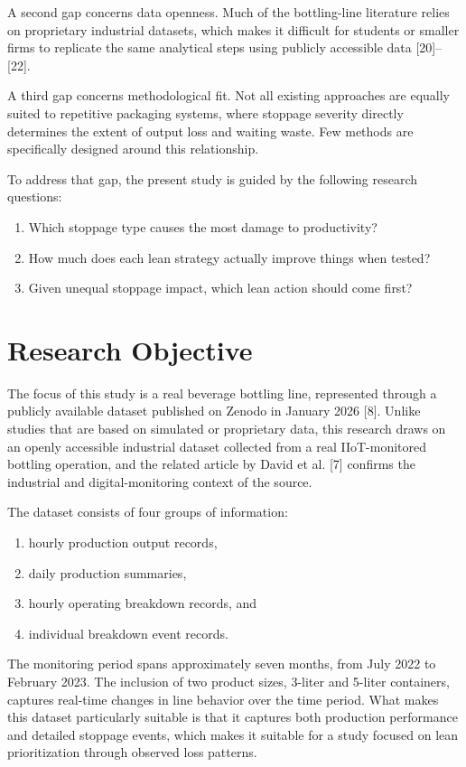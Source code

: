 \documentclass[12pt,a4paper]{article}
\begin{document}
A second gap concerns data openness. Much of the bottling-line literature relies on proprietary industrial datasets, which makes it difficult for students or smaller firms to replicate the same analytical steps using publicly accessible data [20]--[22].

A third gap concerns methodological fit. Not all existing approaches are equally suited to repetitive packaging systems, where stoppage severity directly determines the extent of output loss and waiting waste. Few methods are specifically designed around this relationship.

To address that gap, the present study is guided by the following research questions:
\begin{enumerate}
    \item Which stoppage type causes the most damage to productivity?
    \item How much does each lean strategy actually improve things when tested?
    \item Given unequal stoppage impact, which lean action should come first?
\end{enumerate}

\section{Research Objective}
The focus of this study is a real beverage bottling line, represented through a publicly available dataset published on Zenodo in January 2026 [8]. Unlike studies that are based on simulated or proprietary data, this research draws on an openly accessible industrial dataset collected from a real IIoT-monitored bottling operation, and the related article by David et al. [7] confirms the industrial and digital-monitoring context of the source.

The dataset consists of four groups of information:
\begin{enumerate}
    \item hourly production output records,
    \item daily production summaries,
    \item hourly operating breakdown records, and
    \item individual breakdown event records.
\end{enumerate}

The monitoring period spans approximately seven months, from July 2022 to February 2023. The inclusion of two product sizes, 3-liter and 5-liter containers, captures real-time changes in line behavior over the time period. What makes this dataset particularly suitable is that it captures both production performance and detailed stoppage events, which makes it suitable for a study focused on lean prioritization through observed loss patterns.
\end{document}
